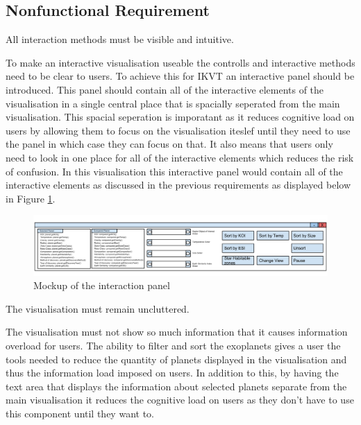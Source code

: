 \subsection{Nonfunctional Requirement}

\begin{enumerate}


{\bf \item[R6.] All interaction methods must be visible and intuitive.}

To make an interactive visualisation useable the controlls and interactive
methods need to be clear to users. To achieve this for IKVT an interactive panel
should be introduced. This panel should contain all of the interactive elements
of the visualisation in a single central place that is spacially seperated from
the main visualisation. This spacial seperation is imporatant as it reduces
cognitive load on users by allowing them to focus on the visualisation iteslef
until they need to use the panel in which case they can focus on that. It also
means that users only need to look in one place for all of the interactive
elements which reduces the risk of confusion. In this visualisation this
interactive panel would contain all of the interactive elements as discussed in
the previous requirements as displayed below in Figure
\ref{fig:interactionPanelMock}.

\begin{figure}[H]
  \centering
      \includegraphics[width=1\textwidth]{images/allTogether.png}
  \caption{Mockup of the interaction panel}  
  \label{fig:interactionPanelMock}
\end{figure}

\clearpage
{\bf \item[R7.] The visualisation must remain uncluttered.}

The visualisation must not show so much information that it
causes information overload for users. The ability to filter and sort the
exoplanets gives a user the tools needed to
reduce the quantity of planets displayed in the visualisation and thus the
information load imposed on users. In addition to this, by having the text area
that displays the information about
selected planets separate from the main visualisation it reduces the cognitive
load on users as they don't have to use this component until they want to.


\end{enumerate}

